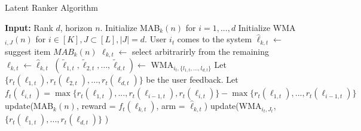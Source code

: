 \begin{algorithm}
\caption{Latent Ranker Algorithm}
\label{alg:latent-rank}
  \begin{algorithmic}[1]
  \State \textbf{Input:} Rank $d$, horizon $n$.
  \State Initialize MAB$_k(n)$ for $i=1,...,d$
  \State Initialize WMA$_{i,J}(n)$ for $i \in [K], J \subset [L], |J| = d.$
      \State User $i_t$ comes to the system
      \State $\hat{{\ell}}_{k,t} \leftarrow$ suggest item $MAB_k(n)$
      \State ${\ell}_{k,t} \leftarrow$ select arbitrarirly from the remaining
      \Else
      \State $\ell_{k,t} \leftarrow \hat{\ell}_{k,t}$
      \EndIf
      \EndFor
      \State $(\tilde{\ell}_{1,t},\tilde{\ell}_{2,t},\dots,\tilde{\ell}_{d,t} )\leftarrow$ WMA$_{i_t,\{ l_{1,t},...,l_{d,t} \} }$ %
      \State Let  $\{ r_{t}(\ell_{1,t}), r_{t}(\ell_{2,t}),\dots,r_{t}(\ell_{d,t}) \}$ be the user feedback.
      \State Let $f_t(\ell_{i,t}) = \max \{ r_t(\ell_{1,t}),...,r_t(\ell_{i-1,t}),r_t({\ell}_{i,t}) \} - \max \{ r_t(\ell_{1,t}),...,r_t(\ell_{i-1,t}) \}$ 
      \State update(MAB$_{k}(n)$, reward = $f_t(\ell_{k,t})$, arm = $\hat{\ell}_{k,t}$)
      \State update(WMA$_{i_t,J_t}$,$\{ r_t(\ell_{1,t}),...,r_t(\ell_{d,t})\}$ )
    \EndFor
  \end{algorithmic}
\end{algorithm}

